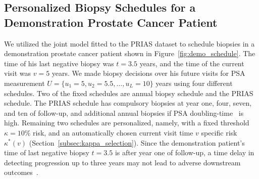 \documentclass[useAMS, usenatbib, referee]{biom}
\begin{document}
\subsection{Personalized Biopsy Schedules for a Demonstration Prostate Cancer Patient}
\label{subsec:demo_patient}
We utilized the joint model fitted to the PRIAS dataset to schedule biopsies in a demonstration prostate cancer patient shown in Figure~\ref{fig:demo_schedule}. The time of his last negative biopsy was $t=3.5$ years, and the time of the current visit was $v=5$ years. We made biopsy decisions over his future visits for PSA measurement $U=\{u_1=5, u_2=5.5,\ldots,u_L=10\}$ years using four different schedules. Two of the fixed schedules are annual biopsy schedule and the PRIAS schedule. The PRIAS schedule has compulsory biopsies at year one, four, seven, and ten of follow-up, and additional annual biopsies if PSA doubling-time~\citep{bokhorst2015compliance} is high. Remaining two schedules are personalized, namely, with a fixed threshold $\kappa=10\%$ risk, and an automatically chosen current visit time $v$ specific risk $\kappa^*(v)$ (Section~\ref{subsec:kappa_selection}). Since the demonstration patient's time of last negative biopsy $t=3.5$ is after year one of follow-up, a time delay in detecting progression
up to three years may not lead to adverse downstream outcomes~\citep{carvalho}.
\end{document}
